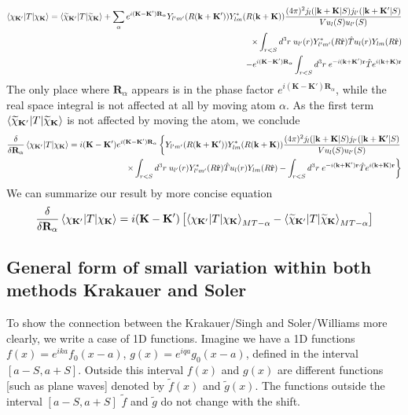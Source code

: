 \documentclass[aps,prb,floatfix,epsfig,singlecolumn,showpacs,preprintnumbers]{revtex4}
\newcommand{\vR}{{\mathbf{R}}}
\renewcommand{\vr}{{\mathbf{r}}}
\newcommand{\vk}{{\mathbf{k}}}
\newcommand{\vK}{{\mathbf{K}}}
\begin{document}
\begin{eqnarray}
\braket{\chi_{\vK'}|T|\chi_{\vK}} = \braket{\widetilde{\chi}_{\vK'}|T|\widetilde{\chi}_{\vK}} + 
%
\sum_\alpha  e^{i(\vK-\vK')\vR_\alpha}
  Y_{l'm'}(R(\vk+\vK'))   Y_{lm}^*(R(\vk+\vK))
\frac{(4\pi)^2 j_l(|\vk+\vK|S) j_{l'}(|\vk+\vK'|S)}{V u_l(S) u_{l'}(S)}
\nonumber\\
\times
\int_{r<S} d^3r \;
u_{l'}(r)  Y^*_{l'm'}(R\hat{\vr}) 
\hat{T}
u_l(r)  Y_{lm}(R\hat{\vr}) \\
-  e^{i(\vK-\vK')\vR_\alpha} \int_{r<S} d^3 r\; e^{-i(\vk+\vK')\vr} \hat{T}  e^{i(\vk+\vK)\vr}
\end{eqnarray}
The only place where $\vR_\alpha$ appears is in the phase factor
$e^{i(\vK-\vK')\vR_\alpha}$, while the real space integral is not
affected at all by moving atom $\alpha$.
As the first term
$\braket{\widetilde{\chi}_{\vK'}|T|\widetilde{\chi}_{\vK}}$ is not
affected by moving the atom, we conclude
\begin{eqnarray}
\frac{\delta}{\delta\vR_\alpha}\braket{\chi_{\vK'}|T|\chi_{\vK}} = 
%
i(\vK-\vK') e^{i(\vK-\vK')\vR_\alpha}\left\{
%
  Y_{l'm'}(R(\vk+\vK'))   Y_{lm}^*(R(\vk+\vK))
\frac{(4\pi)^2 j_l(|\vk+\vK|S) j_{l'}(|\vk+\vK'|S)}{V u_l(S)
  u_{l'}(S)}
\right.
\nonumber\\
\left.
\times
\int_{r<S} d^3r \;
u_{l'}(r)  Y^*_{l'm'}(R\hat{\vr}) 
\hat{T}
u_l(r)  Y_{lm}(R\hat{\vr}) 
-\int_{r<S} d^3 r\; e^{-i(\vk+\vK')\vr} \hat{T}  e^{i(\vk+\vK)\vr}\right\}
\end{eqnarray}
We can summarize our result by more concise equation
\begin{eqnarray}
\frac{\delta}{\delta\vR_\alpha}\braket{\chi_{\vK'}|T|\chi_{\vK}} = 
i(\vK-\vK') \left[\braket{\chi_{\vK'}|T|\chi_{\vK}}_{MT-\alpha} -\braket{\widetilde{\chi}_{\vK'}|T|\widetilde{\chi}_{\vK}}_{MT-\alpha} \right]
\end{eqnarray}

\subsection{General form of small variation within both methods  Krakauer and Soler}

To show the connection between the Krakauer/Singh and Soler/Williams
more clearly, we write a case of 1D functions.
Imagine we have a 1D functions $f(x)=e^{i k a} f_0(x-a)$, $g(x)=e^{i  q a} g_0(x-a)$, defined in the interval $[a-S,a+S]$.
Outside this interval $f(x)$ and $g(x)$ are different functions [such
as plane waves] denoted by $\tilde{f}(x)$ and $\tilde{g}(x)$.
The functions outside the interval $[a-S,a+S]$ $\tilde{f}$ and
$\tilde{g}$ do not change with the shift.
\end{document}
